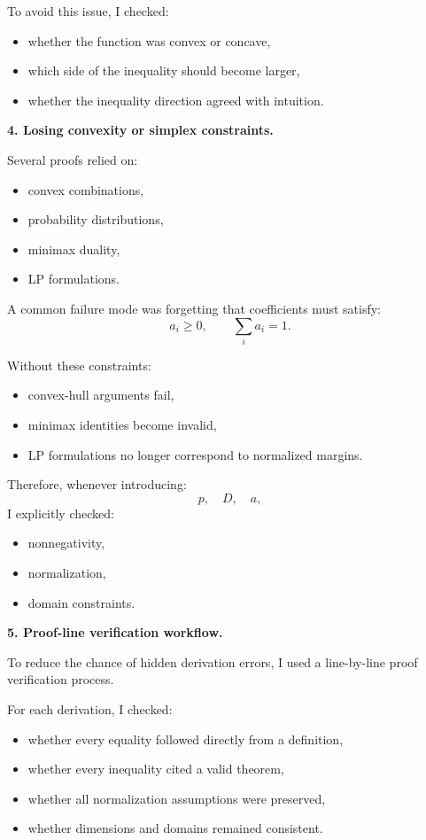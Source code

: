 \documentclass[11pt]{article}
\begin{document}
\begin{enumerate}
\begin{solutionbox}
To avoid this issue, I checked:
\begin{itemize}
    \item whether the function was convex or concave,
    \item which side of the inequality should become larger,
    \item whether the inequality direction agreed with intuition.
\end{itemize}

\medskip

\textbf{4. Losing convexity or simplex constraints.}

Several proofs relied on:
\begin{itemize}
    \item convex combinations,
    \item probability distributions,
    \item minimax duality,
    \item LP formulations.
\end{itemize}

A common failure mode was forgetting that coefficients must satisfy:
\[
a_i\ge0,
\qquad
\sum_ia_i=1.
\]

Without these constraints:
\begin{itemize}
    \item convex-hull arguments fail,
    \item minimax identities become invalid,
    \item LP formulations no longer correspond to normalized margins.
\end{itemize}

Therefore, whenever introducing:
\[
p,
\quad
D,
\quad
a,
\]
I explicitly checked:
\begin{itemize}
    \item nonnegativity,
    \item normalization,
    \item domain constraints.
\end{itemize}

\medskip

\textbf{5. Proof-line verification workflow.}

To reduce the chance of hidden derivation errors, I used a line-by-line proof verification process.

For each derivation, I checked:
\begin{itemize}
    \item whether every equality followed directly from a definition,
    \item whether every inequality cited a valid theorem,
    \item whether all normalization assumptions were preserved,
    \item whether dimensions and domains remained consistent.
\end{itemize}


\end{solutionbox}
\end{enumerate}
\end{document}
